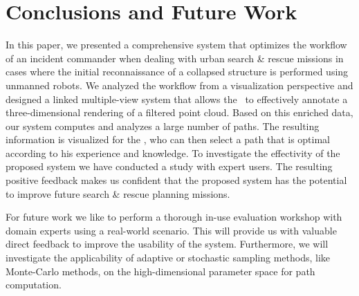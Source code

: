 \section{Conclusions and Future Work} \label{sec:conclusion}
In this paper, we presented a comprehensive system that optimizes the workflow of an incident commander when dealing with urban search \& rescue missions in cases where the initial reconnaissance of a collapsed structure is performed using unmanned robots. We analyzed the workflow from a visualization perspective and designed a linked multiple-view system that allows the \IC\ to effectively annotate a three-dimensional rendering of a filtered point cloud. Based on this enriched data, our system computes and analyzes a large number of paths. The resulting information is visualized for the \IC , who can then select a path that is optimal according to his experience and knowledge. To investigate the effectivity of the proposed system we have conducted a study with expert users. The resulting positive feedback makes us confident that the proposed system has the potential to improve future search \& rescue planning missions.

For future work we like to perform a thorough in-use evaluation workshop with domain experts using a real-world scenario. This will provide us with valuable direct feedback to improve the usability of the system. Furthermore, we will investigate the applicability of adaptive or stochastic sampling methods, like Monte-Carlo methods, on the high-dimensional parameter space for path computation.
